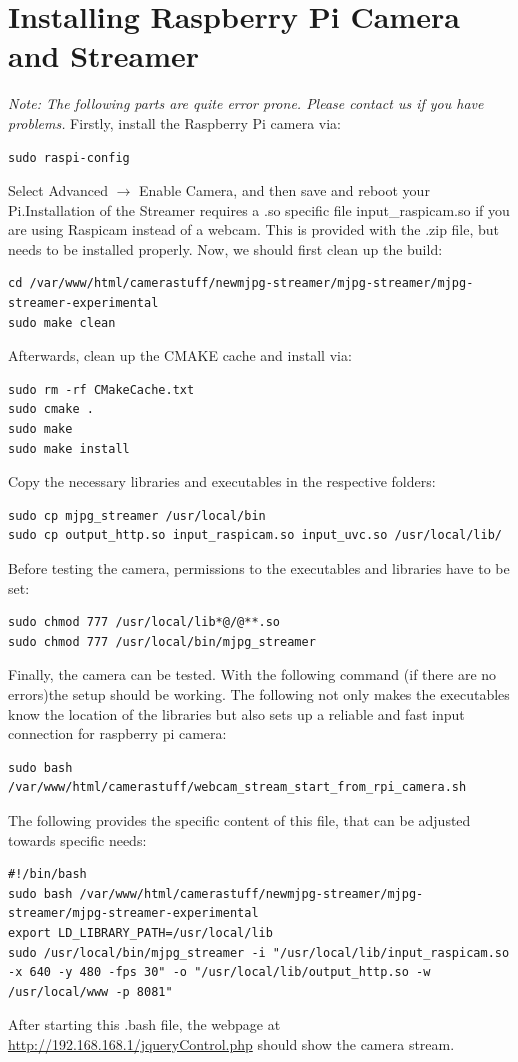 \section{Installing Raspberry Pi Camera and Streamer}
\textit{Note: The following parts are quite error prone. Please contact us if you have problems.}
Firstly, install the Raspberry Pi camera via:
\begin{lstlisting}
sudo raspi-config
\end{lstlisting}
Select Advanced $\rightarrow$ Enable Camera, and then save and reboot your Pi.Installation of the Streamer requires a .so specific file input\_raspicam.so if you are using Raspicam instead of a webcam. This is provided with the .zip file, but needs to be installed properly. Now, we should first clean up the build:
\begin{lstlisting}
cd /var/www/html/camerastuff/newmjpg-streamer/mjpg-streamer/mjpg-streamer-experimental
sudo make clean
\end{lstlisting}
Afterwards, clean up the CMAKE cache and install via:
\begin{lstlisting}
sudo rm -rf CMakeCache.txt
sudo cmake .
sudo make
sudo make install
\end{lstlisting}
Copy the necessary libraries and executables in the respective folders:
\begin{lstlisting}
sudo cp mjpg_streamer /usr/local/bin
sudo cp output_http.so input_raspicam.so input_uvc.so /usr/local/lib/
\end{lstlisting}
Before testing the camera,  permissions to the executables and libraries have to be set:
\begin{lstlisting}
sudo chmod 777 /usr/local/lib*@/@**.so
sudo chmod 777 /usr/local/bin/mjpg_streamer
\end{lstlisting}
Finally, the camera can be tested. With the following command (if there are no errors)the setup should be working. The following not only makes the executables know the location of the libraries but also sets up a reliable and fast input connection for raspberry pi camera:
\begin{lstlisting}
sudo bash /var/www/html/camerastuff/webcam_stream_start_from_rpi_camera.sh
\end{lstlisting}
The following provides the specific content of this file, that can be adjusted towards specific needs:
\begin{lstlisting}
#!/bin/bash
sudo bash /var/www/html/camerastuff/newmjpg-streamer/mjpg-streamer/mjpg-streamer-experimental 
export LD_LIBRARY_PATH=/usr/local/lib
sudo /usr/local/bin/mjpg_streamer -i "/usr/local/lib/input_raspicam.so -x 640 -y 480 -fps 30" -o "/usr/local/lib/output_http.so -w /usr/local/www -p 8081"
\end{lstlisting}
After starting this .bash file, the webpage at \url{http://192.168.168.1/jqueryControl.php} should show the camera stream.
\newpage
